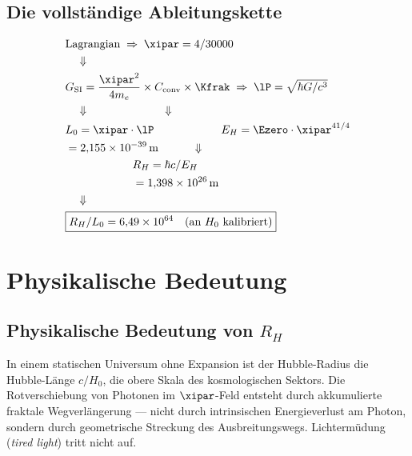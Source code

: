 \subsection{Die vollständige Ableitungskette}

\begin{keyresult}
\begin{align}
	&\text{Lagrangian} \;\Rightarrow\; \xipar = 4/30000 \notag \\
	&\quad\Downarrow \notag \\
	&G_{\text{SI}} = \frac{\xipar^2}{4m_e} \times C_{\text{conv}} \times \Kfrak \;\Rightarrow\; \lP = \sqrt{\hbar G/c^3} \notag \\
	&\quad\Downarrow\qquad\qquad\qquad\quad\Downarrow \notag \\
	&L_0 = \xipar \cdot \lP \qquad\qquad\qquad E_H = \Ezero \cdot \xipar^{41/4} \notag \\
	&= 2{,}155 \times 10^{-39}\,\text{m} \qquad\quad\Downarrow \notag \\
	&\qquad\qquad\qquad R_H = \hbar c/E_H \notag \\
	&\qquad\qquad\qquad = 1{,}398 \times 10^{26}\,\text{m} \notag \\
	&\quad\Downarrow \notag \\
	&\boxed{R_H/L_0 = 6{,}49 \times 10^{64} \quad \text{(an } H_0 \text{ kalibriert)}}
\end{align}
\end{keyresult}

\section{Physikalische Bedeutung}

\subsection{Physikalische Bedeutung von \texorpdfstring{$R_H$}{R\_H}}

In einem statischen Universum ohne Expansion ist der Hubble-Radius die Hubble-Länge $c/H_0$, die obere Skala des kosmologischen Sektors. Die Rotverschiebung von Photonen im $\xipar$-Feld entsteht durch akkumulierte fraktale Wegverlängerung — nicht durch intrinsischen Energieverlust am Photon, sondern durch geometrische Streckung des Ausbreitungswegs. Lichter\-müdung (\textit{tired light}) tritt nicht auf.

